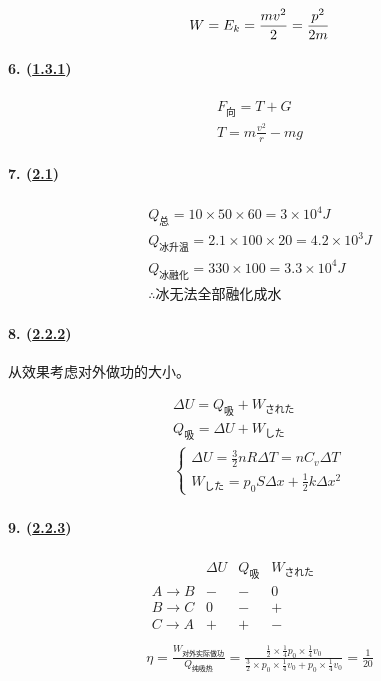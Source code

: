 \begin{equation*}
        W=E_k=\frac{mv^2}{2}=\frac{p^2}{2m}\\
\end{equation*}

\paragraph{6. (\hyperref[subsec:1.3.1]{1.3.1})}

\begin{gather*}
    F_\textrm{向}=T+G\\
    T=m\frac{v^2}{r}-mg
\end{gather*}

\paragraph{7. (\hyperref[sec:2.1]{2.1})}

\begin{gather*}
    Q_\textrm{总}=10\times50\times60=3\times10^4J\\
    Q_\textrm{冰升温}=2.1\times100\times20=4.2\times10^3J\\
    Q_\textrm{冰融化}=330\times100=3.3\times10^4J\\
    \therefore\textrm{冰无法全部融化成水}
\end{gather*}

\paragraph{8. (\hyperref[subsec:2.2.2]{2.2.2})} 从效果考虑对外做功的大小。

\begin{gather*}
    \Delta U=Q_\textrm{吸}+W_\textrm{された}\\
    Q_\textrm{吸}=\Delta U+W_\textrm{した}\\
    \begin{cases}
        \Delta U=\frac32nR\Delta T=nC_v\Delta T\\
        W_\textrm{した}=p_0S\Delta x+\frac12k\Delta x^2
    \end{cases}
\end{gather*}

\paragraph{9. (\hyperref[subsec:2.2.3]{2.2.3})}

\begin{gather*}
    \begin{array}{c|ccc}
        & \Delta U & Q_\textrm{吸} & W_\textrm{された} \\\hline
        A\to B & - & - & 0 \\
        B\to C & 0 & - & + \\
        C\to A & + & + & - \\
    \end{array}\\
    \eta=\frac{W_\textrm{对外实际做功}}{Q_\textrm{纯吸热}}
    =\frac{\frac12\times\frac14p_0\times\frac14v_0}{\frac32\times p_0\times\frac14v_0+p_0\times\frac14v_0}=\frac{1}{20}
\end{gather*}

